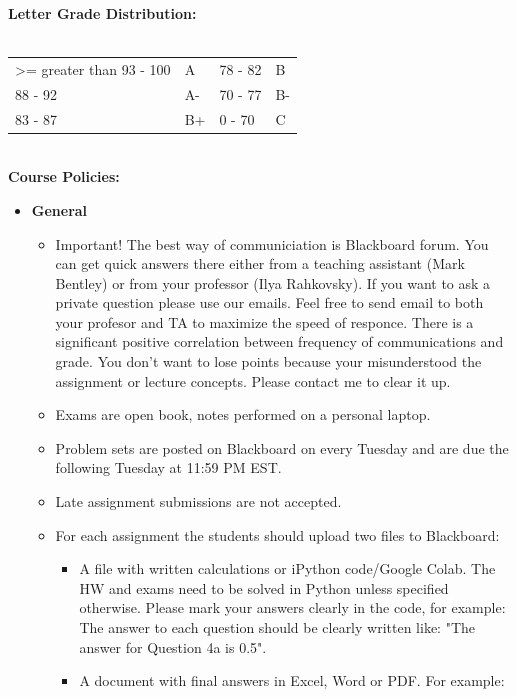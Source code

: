 \documentclass[11pt]{article}
\begin{document}
\textbf {\large Letter Grade Distribution:} \\\\
\hspace*{40mm}
\begin{tabular}{ l l | l l }
\textgreater= greater than 93 - 100 & A & 78 - 82 & B  \\
                      88 - 92 & A-  & 70 - 77  & B-  \\
                     83 - 87  & B+  & 0 - 70 & C \\
\end{tabular} \\
\newpage
\textbf {\large Course Policies:}
\begin{itemize}
	\item \textbf {General}
		\begin{itemize}
\item {\color{red} Important!} The best way of communiciation is Blackboard forum. You can get quick answers there either from a teaching assistant (Mark Bentley) or from your professor (Ilya Rahkovsky). If you want to ask a private question please use our emails. Feel free to send email to both your profesor and TA to maximize the speed of responce. There is a significant positive correlation between frequency of communications and grade. You don't want to lose points because your misunderstood the assignment or lecture concepts. Please contact me to clear it up.
			\item Exams are open book, notes performed on a personal laptop.
			\item Problem sets are posted on Blackboard on every Tuesday and are due the following Tuesday at 11:59 PM EST.
            \item Late assignment submissions are not accepted.
\item For each assignment the students should upload two files to Blackboard:
		\begin{itemize}
        \item A file with written calculations or iPython code/Google Colab. The HW and exams need to be solved in Python unless specified otherwise. Please mark your answers clearly in the code, for example: The answer to each question should be clearly written like: "The answer for Question 4a is 0.5". 
        \item A document with final answers in Excel, Word or PDF. For example: \newline

\end{itemize}
\end{itemize}
\end{itemize}
\end{document}
